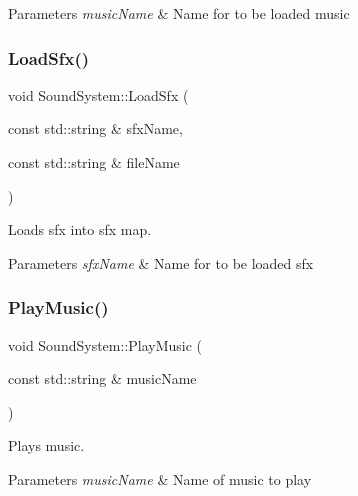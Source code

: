\begin{DoxyParams}{Parameters}
{\em music\+Name} & Name for to be loaded music \\
\hline
\end{DoxyParams}
\mbox{\label{class_sound_system_a43c3e75eb53c8d071b5d47a07b6d42fd}} 
\subsubsection{\texorpdfstring{Load\+Sfx()}{LoadSfx()}}
{\footnotesize\ttfamily void Sound\+System\+::\+Load\+Sfx (\begin{DoxyParamCaption}\item[{const std\+::string \&}]{sfx\+Name,  }\item[{const std\+::string \&}]{file\+Name }\end{DoxyParamCaption})\hspace{0.3cm}{\ttfamily [static]}}



Loads sfx into sfx map. 


\begin{DoxyParams}{Parameters}
{\em sfx\+Name} & Name for to be loaded sfx \\
\hline
\end{DoxyParams}
\mbox{\label{class_sound_system_ac3c183dad9bb7a534d447f0189a2ce23}} 
\subsubsection{\texorpdfstring{Play\+Music()}{PlayMusic()}}
{\footnotesize\ttfamily void Sound\+System\+::\+Play\+Music (\begin{DoxyParamCaption}\item[{const std\+::string \&}]{music\+Name }\end{DoxyParamCaption})\hspace{0.3cm}{\ttfamily [static]}}



Plays music. 


\begin{DoxyParams}{Parameters}
{\em music\+Name} & Name of music to play \\
\hline
\end{DoxyParams}
\mbox{\label{class_sound_system_a9682a8b69a9d40dcb85ba79e3c08da26}} 
